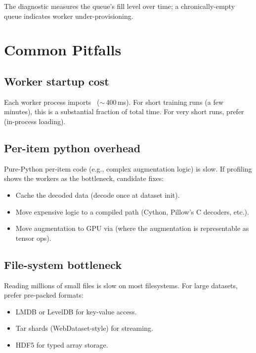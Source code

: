 The diagnostic measures the queue's fill level over time; a
chronically-empty queue indicates worker under-provisioning.

\section{Common Pitfalls}
\label{sec:data_pipeline:pitfalls}

\subsection{Worker startup cost}
\label{ssec:data_pipeline:worker_startup_cost}

Each worker process imports \Lucid\ (\(\sim\)\,400\,ms). For
short training runs (a few minutes), this is a substantial
fraction of total time. For very short runs, prefer
 (in-process loading).

\subsection{Per-item python overhead}
\label{ssec:data_pipeline:py_overhead}

Pure-Python per-item code (e.g., complex augmentation logic) is
slow. If profiling shows the workers as the bottleneck,
candidate fixes:
\begin{itemize}
  \item Cache the decoded data (decode once at dataset init).
  \item Move expensive logic to a compiled path (Cython,
    Pillow's C decoders, etc.).
  \item Move augmentation to GPU via
     (where the augmentation is
    representable as tensor ops).
\end{itemize}

\subsection{File-system bottleneck}
\label{ssec:data_pipeline:fs_bottleneck}

Reading millions of small files is slow on most filesystems.
For large datasets, prefer pre-packed formats:
\begin{itemize}
  \item LMDB or LevelDB for key-value access.
  \item Tar shards (WebDataset-style) for streaming.
  \item HDF5 for typed array storage.
\end{itemize}

